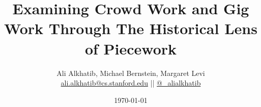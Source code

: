 \documentclass[aspectratio=169,12pt,noslidenumbers]{beamer} %
\title{Examining Crowd Work and Gig Work Through The Historical Lens of Piecework}
\author{{Ali Alkhatib}, Michael Bernstein, Margaret Levi\\
\href{mailto:ali.alkhatib@cs.stanford.edu}{ali.alkhatib@cs.stanford.edu} ||
         \href{http://twitter.com/_alialkhatib}{@\_alialkhatib}}
\institute[Stanford]{Stanford University}
\date{\today}
\newcommand{\onlyinsubfile}[1]{#1}
\newcommand{\notinsubfile}[1]{}
\begin{document}
\renewcommand{\onlyinsubfile}[1]{}
\renewcommand{\notinsubfile}[1]{#1}

\begin{frame}
\titlepage
\end{frame}









\end{document}
